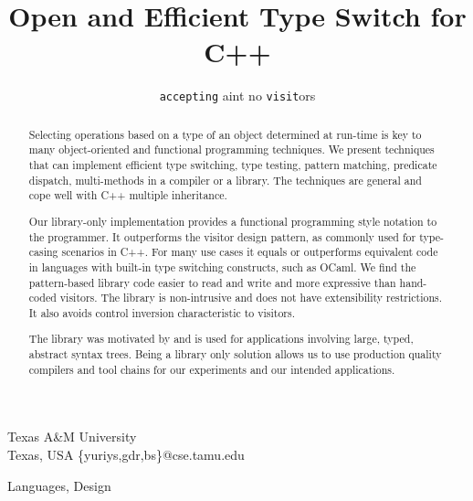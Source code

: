 \documentclass[preprint]{sigplanconf}
\makeatletter
\DeclareRobustCommand{\code}[1]{{\lstinline[breaklines=false,escapechar=@]{#1}}}
\makeatother
\begin{document}


\title{Open and Efficient Type Switch for C++}
\subtitle{\code{accepting} aint no \code{visit}ors}

           {Texas A\&M University\\ Texas, USA}
           {\{yuriys,gdr,bs\}@cse.tamu.edu}

\maketitle

\begin{abstract}
Selecting operations based on a type of an object determined at run-time is key 
to many object-oriented and functional programming techniques. We present 
techniques that can implement efficient type switching, type testing, pattern 
matching, predicate dispatch, multi-methods in a compiler or a library. The 
techniques are general and cope well with C++ multiple inheritance.

Our library-only implementation provides a functional programming style notation 
to the programmer. It outperforms the visitor design pattern, as commonly used 
for type-casing scenarios in C++. For many use cases it equals or outperforms 
equivalent code in languages with built-in type switching constructs, such as 
OCaml. We find the pattern-based library code easier to read and write and more 
expressive than hand-coded visitors. The library is non-intrusive and does not have 
extensibility restrictions. It also avoids control inversion characteristic to 
visitors.
 
The library was motivated by and is used for applications involving large, 
typed, abstract syntax trees. Being a library only solution allows us to use 
production quality compilers and tool chains for our experiments and our 
intended applications.
\end{abstract}


\terms
Languages, Design
\end{document}
